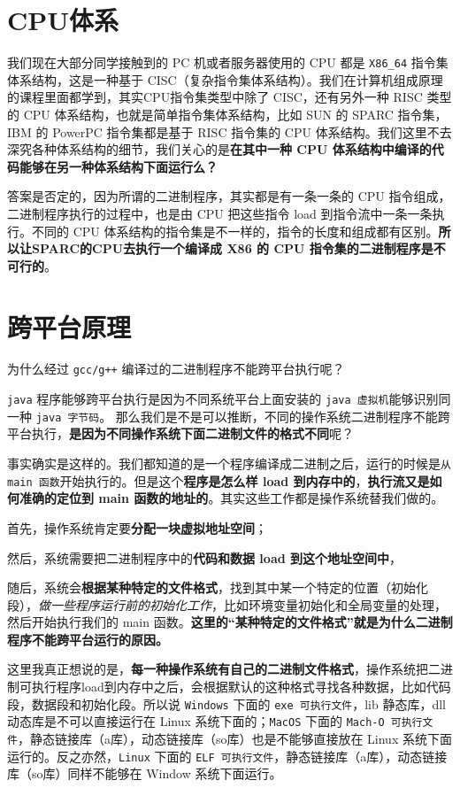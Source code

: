 \documentclass[UTF8,a4paper,12pt]{ctexbook}
\begin{document}
	\section{CPU体系}
		我们现在大部分同学接触到的 PC 机或者服务器使用的 CPU 都是 \verb|X86_64| 指令集体系结构，这是一种基于 CISC（复杂指令集体系结构）。我们在计算机组成原理的课程里面都学到，其实CPU指令集类型中除了 CISC，还有另外一种 RISC 类型的 CPU 体系结构，也就是简单指令集体系结构，比如 SUN 的 SPARC 指令集，IBM 的 PowerPC 指令集都是基于 RISC 指令集的 CPU 体系结构。我们这里不去深究各种体系结构的细节，我们关心的是\textbf{在其中一种 CPU 体系结构中编译的代码能够在另一种体系结构下面运行么？}
		
		答案是否定的，因为所谓的二进制程序，其实都是有一条一条的 CPU 指令组成，二进制程序执行的过程中，也是由 CPU 把这些指令 load 到指令流中一条一条执行。不同的 CPU 体系结构的指令集是不一样的，指令的长度和组成都有区别。\textbf{所以让SPARC的CPU去执行一个编译成 X86 的 CPU 指令集的二进制程序是不可行的}。
	
	
	\section{跨平台原理}
		为什么经过 \verb|gcc/g++| 编译过的二进制程序不能跨平台执行呢？
		
		\verb|java| 程序能够跨平台执行是因为不同系统平台上面安装的 \verb|java 虚拟机|能够识别同一种 \verb|java 字节码|。
		那么我们是不是可以推断，不同的操作系统二进制程序不能跨平台执行，\textbf{是因为不同操作系统下面二进制文件的格式不同}呢？
		
		事实确实是这样的。我们都知道的是一个程序编译成二进制之后，运行的时候是\verb|从 main 函数|开始执行的。但是这个\textbf{程序是怎么样 load 到内存中的}，\textbf{执行流又是如何准确的定位到 main 函数的地址的}。其实这些工作都是操作系统替我们做的。
		
		首先，操作系统肯定要\textbf{分配一块虚拟地址空间}；
		
		然后，系统需要把二进制程序中的\textbf{代码和数据 load 到这个地址空间中}，
		
		随后，系统会\textbf{根据某种特定的文件格式}，找到其中某一个特定的位置（初始化段），\textit{做一些程序运行前的初始化工作}，比如环境变量初始化和全局变量的处理，然后开始执行我们的 main 函数。\textbf{这里的“某种特定的文件格式”就是为什么二进制程序不能跨平台运行的原因。}
		
		这里我真正想说的是，\textbf{每一种操作系统有自己的二进制文件格式}，操作系统把二进制可执行程序load到内存中之后，会根据默认的这种格式寻找各种数据，比如代码段，数据段和初始化段。所以说 \verb|Windows| 下面的 \verb|exe 可执行文件|，lib 静态库，dll 动态库是不可以直接运行在 Linux 系统下面的；\verb|MacOS| 下面的 \verb|Mach-O 可执行文件|，静态链接库（a库），动态链接库（so库）也是不能够直接放在 Linux 系统下面运行的。反之亦然，\verb|Linux| 下面的 \verb|ELF 可执行文件|，静态链接库（a库），动态链接库（so库）同样不能够在 Window 系统下面运行。
	
\end{document}
